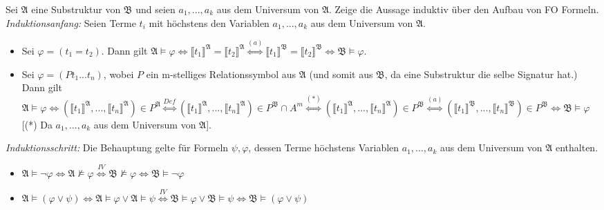 \documentclass[11pt, a4paper]{article}
\begin{document}
\begin{adjustwidth}{20pt}{20pt}
	Sei $\mathfrak{A}$ eine Substruktur von $\mathfrak{B}$ und seien $a_1,...,a_k$ aus dem Universum von $\mathfrak{A}$. Zeige die Aussage induktiv über den Aufbau von FO Formeln.\\
	\textit{Induktionsanfang:} Seien Terme $t_i$ mit höchstens den Variablen $a_1,...,a_k$ aus dem Universum von $\mathfrak{A}$.
	\begin{itemize}
	\item Sei $\varphi=(t_1=t_2)$. Dann gilt $\mathfrak{A} \models \varphi \Leftrightarrow \llbracket t_1 \rrbracket^\mathfrak{A} = \llbracket t_2 \rrbracket^\mathfrak{A}
			\overset{(a)}{\Leftrightarrow} \llbracket t_1 \rrbracket^\mathfrak{B} = \llbracket t_2 \rrbracket^\mathfrak{B} \Leftrightarrow \mathfrak{B} \models \varphi$.
	\item Sei $\varphi=(Pt_1...t_n)$, wobei $P$ ein m-stelliges Relationssymbol aus $\mathfrak{A}$ (und somit aus $\mathfrak{B}$, da eine Substruktur die selbe Signatur hat.)\\
		Dann gilt $ \mathfrak{A} \models \varphi  \Leftrightarrow (\llbracket t_1 \rrbracket^\mathfrak{A},...,\llbracket t_n \rrbracket^\mathfrak{A}) \in P^{\mathfrak{A}}
		\overset{Def}{\Leftrightarrow} (\llbracket t_1 \rrbracket^\mathfrak{A},...,\llbracket t_n \rrbracket^\mathfrak{A}) \in P^{\mathfrak{B}} \cap A^m  \overset{(*)}{\Leftrightarrow } 
		(\llbracket t_1 \rrbracket^\mathfrak{A},...,\llbracket t_n \rrbracket^\mathfrak{A}) \in P^{\mathfrak{B}} \overset{(a)}{\Leftrightarrow }
		(\llbracket t_1 \rrbracket^\mathfrak{B},...,\llbracket t_n \rrbracket^\mathfrak{B}) \in P^{\mathfrak{B}} \Leftrightarrow \mathfrak{B} \models \varphi$
		[(*) Da $a_1,...,a_k$ aus dem Universum von $\mathfrak{A}$].
	\end{itemize}
	\textit{Induktionsschritt:} Die Behauptung gelte für Formeln $\psi, \varphi$, dessen Terme höchstens Variablen $a_1,...,a_k$ aus dem Universum von $\mathfrak{A}$ enthalten.
	\begin{itemize}
	\item $\mathfrak{A} \models \neg\varphi \Leftrightarrow \mathfrak{A} \not\models \varphi \overset{IV}{\Leftrightarrow} \mathfrak{B} \not\models \varphi \Leftrightarrow
		\mathfrak{B} \models \neg\varphi $
	\item $\mathfrak{A} \models (\varphi \vee \psi) \Leftrightarrow \mathfrak{A} \models \varphi \vee \mathfrak{A} \models \psi \overset{IV}{\Leftrightarrow}
		\mathfrak{B} \models \varphi \vee \mathfrak{B} \models \psi \Leftrightarrow \mathfrak{B} \models (\varphi \vee \psi)$

\end{itemize}
\end{adjustwidth}
\end{document}
